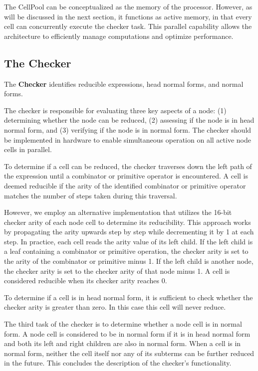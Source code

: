 \documentclass{IEEEtran}
\begin{document}
\par The CellPool can be conceptualized as the memory of the processor. However, as will be discussed in the next section, it functions as active memory, in that every cell can concurrently execute the checker task. This parallel capability allows the architecture to efficiently manage computations and optimize performance.

\subsection{The Checker}
The \textbf{Checker} identifies reducible expressions, head normal forms, and normal forms.

\par The checker is responsible for evaluating three key aspects of a node: (1) determining whether the node can be reduced, (2) assessing if the node is in head normal form, and (3) verifying if the node is in normal form. The checker should be implemented in hardware to enable simultaneous operation on all active node cells in parallel.

\par To determine if a cell can be reduced, the checker traverses down the left path of the expression until a combinator or primitive operator is encountered. A cell is deemed reducible if the arity of the identified combinator or primitive operator matches the number of steps taken during this traversal.

\par However, we employ an alternative implementation that utilizes the 16-bit checker arity of each node cell to determine its reducibility. This approach works by propagating the arity upwards step by step while decrementing it by 1 at each step. In practice, each cell reads the arity value of its left child. If the left child is a leaf containing a combinator or primitive operation, the checker arity is set to the arity of the combinator or primitive minus 1. If the left child is another node, the checker arity is set to the checker arity of that node minus 1. A cell is considered reducible when its checker arity reaches 0.

\par To determine if a cell is in head normal form, it is sufficient to check whether the checker arity is greater than zero. In this case this cell will never reduce.

\par The third task of the checker is to determine whether a node cell is in normal form. A node cell is considered to be in normal form if it is in head normal form and both its left and right children are also in normal form. When a cell is in normal form, neither the cell itself nor any of its subterms can be further reduced in the future. This concludes the description of the checker's functionality.
\end{document}
